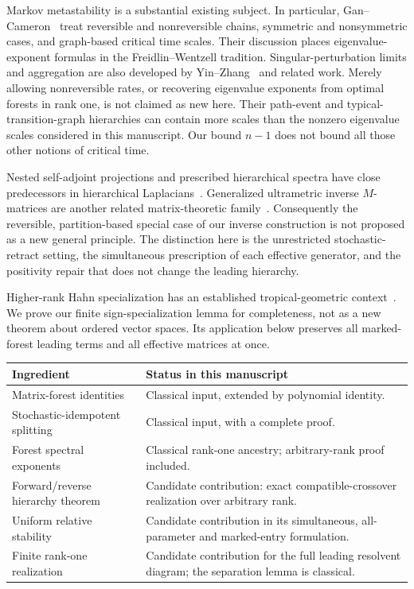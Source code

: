 \documentclass[11pt]{article}
\numberwithin{equation}{section}
\theoremstyle{definition}
\theoremstyle{remark}
\begin{document}
Markov metastability is a substantial existing subject. In particular,
Gan--Cameron~\cite{GC} treat reversible and nonreversible chains, symmetric and
nonsymmetric cases, and graph-based critical time scales. Their discussion
places eigenvalue-exponent formulas in the Freidlin--Wentzell tradition.
Singular-perturbation limits and aggregation are also developed by
Yin--Zhang~\cite{YZ} and related work. Merely allowing nonreversible rates, or
recovering eigenvalue exponents from optimal forests in rank one, is not claimed
as new here. Their path-event and typical-transition-graph hierarchies can contain
more scales than the nonzero eigenvalue scales considered in this manuscript.
Our bound $n-1$ does not bound all those other notions of critical time.

Nested self-adjoint projections and prescribed hierarchical spectra have close
predecessors in hierarchical Laplacians~\cite{BK}. Generalized ultrametric
inverse $M$-matrices are another related matrix-theoretic family~\cite{NV}.
Consequently the reversible, partition-based special case of our inverse
construction is not proposed as a new general principle. The distinction here
is the unrestricted stochastic-retract setting, the simultaneous prescription
of each effective generator, and the positivity repair that does not change the
leading hierarchy.

Higher-rank Hahn specialization has an established tropical-geometric
context~\cite{JS}. We prove our finite sign-specialization lemma for completeness,
not as a new theorem about ordered vector spaces. Its application below preserves
all marked-forest leading terms and all effective matrices at once.

\begin{center}
\begin{tabular}{p{}p{}}
\toprule
Ingredient & Status in this manuscript\\
\midrule
Matrix-forest identities & Classical input, extended by polynomial identity.\\
Stochastic-idempotent splitting & Classical input, with a complete proof.\\
Forest spectral exponents & Classical rank-one ancestry; arbitrary-rank proof included.\\
Forward/reverse hierarchy theorem & Candidate contribution: exact compatible-crossover realization over arbitrary rank.\\
Uniform relative stability & Candidate contribution in its simultaneous, all-parameter and marked-entry formulation.\\
Finite rank-one realization & Candidate contribution for the full leading resolvent diagram; the separation lemma is classical.\\
\bottomrule
\end{tabular}
\end{center}
\end{document}
